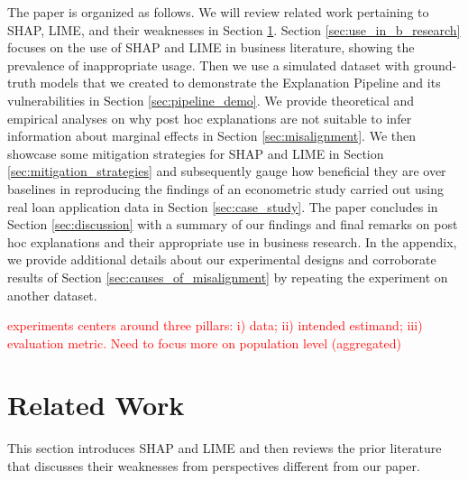 \documentclass[mnsc,blindrev]{informs3}
\newcommand{\tw}[1]{\textcolor{red}{Tong: #1}}
\begin{document}
    The paper is organized as follows. We will review related work pertaining to SHAP, LIME, and their weaknesses in Section \ref{sec:related_work}. Section \ref{sec:use_in_b_research} focuses on the use of SHAP and LIME in business literature, showing the prevalence of inappropriate usage. Then we use a simulated dataset with ground-truth models that we created to demonstrate the Explanation Pipeline and its vulnerabilities in Section \ref{sec:pipeline_demo}.  We provide theoretical and empirical analyses on why post hoc explanations are not suitable to infer information about marginal effects in Section \ref{sec:misalignment}. 
    We then showcase some mitigation strategies for SHAP and LIME in Section \ref{sec:mitigation_strategies} and subsequently gauge how beneficial they are over baselines in reproducing the findings of an econometric study carried out using real loan application data in Section \ref{sec:case_study}. The paper concludes in Section \ref{sec:discussion} with a summary of our findings and final remarks on post hoc explanations and their appropriate use in business research. In the appendix, we provide additional details about our experimental designs and  corroborate results of Section \ref{sec:causes_of_misalignment} by repeating the experiment on another dataset.%

    \textcolor{red}{experiments centers around three pillars: i) data; ii) intended estimand; iii) evaluation metric. Need to focus more on population level (aggregated)}
\section{Related Work}
    \label{sec:related_work}
    This section introduces SHAP and LIME and then reviews the prior literature that discusses their weaknesses from perspectives different from our paper. %
\end{document}
